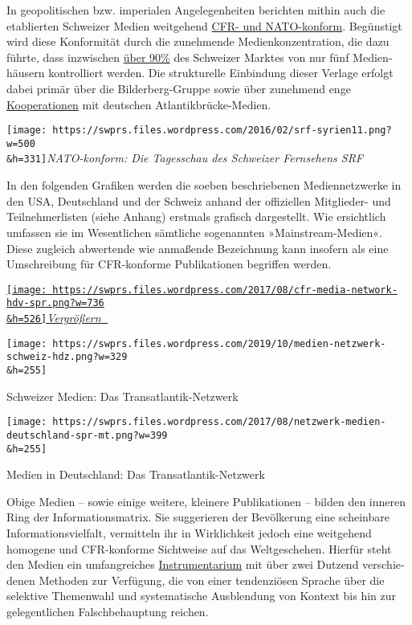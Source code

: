 In geopolitischen bzw. imperialen Angelegenheiten berichten mithin auch
die etablierten Schweizer Medien weitgehend
\href{https://swprs.org/medien-navigator/}{CFR- und NATO-konform}.
Begünstigt wird diese Konformität durch die zunehmende
Medien­konzentration, die dazu führte, dass inzwischen
\href{http://www.foeg.uzh.ch/jahrbuch.html}{über 90\%} des Schweizer
Marktes von nur fünf Medien­häusern kontrolliert werden. Die
strukturelle Einbindung dieser Verlage erfolgt dabei primär über die
Bilderberg-Gruppe sowie über zunehmend enge
\href{https://swprs.org/tagesanzeiger/}{Kooperationen} mit deutschen
Atlantikbrücke-Medien.

\texttt{[image: https://swprs.files.wordpress.com/2016/02/srf-syrien11.png?w=500\\\&h=331]}\emph{NATO-konform:
Die Tagesschau des Schweizer Fernsehens SRF}

In den folgenden Grafiken werden die soeben beschriebenen
Mediennetzwerke in den USA, Deutschland und der Schweiz anhand der
offiziellen Mitglieder- und Teilnehmerlisten (siehe Anhang) erstmals
grafisch dargestellt. Wie ersichtlich umfassen sie im Wesentlichen
sämtliche sogenannten »Mainstream-Medien«. Diese zugleich abwertende wie
anmaßende Bezeichnung kann insofern als eine Umschreibung für
CFR-konforme Publikationen begriffen werden.

\href{https://swprs.files.wordpress.com/2017/08/cfr-media-network-hdv-spr.png}{\texttt{[image: https://swprs.files.wordpress.com/2017/08/cfr-media-network-hdv-spr.png?w=736\\\&h=526]}\emph{Vergrößern}
🔎}

\href{https://swprs.files.wordpress.com/2019/10/medien-netzwerk-schweiz-hdz.png}{}

\texttt{[image: https://swprs.files.wordpress.com/2019/10/medien-netzwerk-schweiz-hdz.png?w=329\\\&h=255]}

Schweizer Medien: Das Transatlantik-Netzwerk

\href{https://swprs.files.wordpress.com/2017/08/netzwerk-medien-deutschland-spr-mt.png}{}

\texttt{[image: https://swprs.files.wordpress.com/2017/08/netzwerk-medien-deutschland-spr-mt.png?w=399\\\&h=255]}

Medien in Deutschland: Das Transatlantik-Netzwerk

Obige Medien -- sowie einige weitere, kleinere Publikationen -- bilden
den inneren Ring der Informationsmatrix. Sie suggerieren der Bevölkerung
eine scheinbare Informationsvielfalt, vermitteln ihr in Wirklichkeit
jedoch eine weitgehend homogene und CFR-konforme Sichtweise auf das
Welt­geschehen. Hierfür steht den Medien ein umfangreiches
\href{https://swprs.org/der-propaganda-schluessel/}{Instrumentarium} mit
über zwei Dutzend ver­schie­denen Methoden zur Verfügung, die von einer
tendenziösen Sprache über die selektive Themen­wahl und systematische
Ausblendung von Kontext bis hin zur gelegentlichen Falschbehauptung
reichen.

